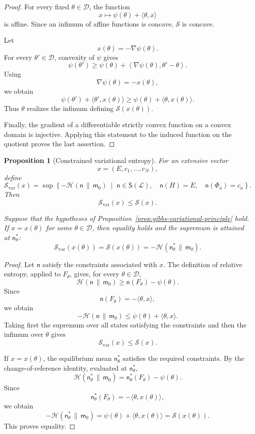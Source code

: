 \documentclass[10pt,a4paper]{amsart}
\newtheorem{Proposition}[Theorem]{Proposition}
\begin{document}
\begin{proof}
For every fixed $\theta\in\mathcal D$, the function
\[
x\longmapsto
\psi(\theta)+\langle\theta,x\rangle
\]
is affine. Since an infimum of affine functions is concave,
$\mathcal S$ is concave.

Let
\[
x(\theta)=-\nabla\psi(\theta).
\]
For every $\theta'\in\mathcal D$, convexity of $\psi$ gives
\[
\psi(\theta')
\geq
\psi(\theta)
+
\left\langle
\nabla\psi(\theta),\theta'-\theta
\right\rangle.
\]
Using
\[
\nabla\psi(\theta)=-x(\theta),
\]
we obtain
\[
\psi(\theta')
+
\langle\theta',x(\theta)\rangle
\geq
\psi(\theta)
+
\langle\theta,x(\theta)\rangle.
\]
Thus $\theta$ realizes the infimum defining
$\mathcal S(x(\theta))$.

Finally, the gradient of a differentiable strictly convex function on a
convex domain is injective. Applying this statement to the induced
function on the quotient proves the last assertion.
\end{proof}

\begin{Proposition}[Constrained variational entropy]
\label{prop:constrained-entropy}
For an extensive vector
\[
x=(E,c_1,\ldots,c_N),
\]
define
\[
\mathcal S_{\mathrm{var}}(x)
=
\sup
\left\{
-\mathcal H(\mathsf n\,\|\,\mathsf m_0)
\;\middle|\;
\mathsf n\in\mathsf S(\mathcal L),
\quad
\mathsf n(H)=E,
\quad
\mathsf n(\Phi_a)=c_a
\right\}.
\]
Then
\[
\mathcal S_{\mathrm{var}}(x)
\leq
\mathcal S(x).
\]

Suppose that the hypotheses of
Proposition~\ref{prop:gibbs-variational-principle} hold. If
$x=x(\theta)$ for some $\theta\in\mathcal D$, then equality holds and
the supremum is attained at $\mathsf n_\theta^*$:
\[
\mathcal S_{\mathrm{var}}(x(\theta))
=
\mathcal S(x(\theta))
=
-\mathcal H(\mathsf n_\theta^*\,\|\,\mathsf m_0).
\]
\end{Proposition}

\begin{proof}
Let $\mathsf n$ satisfy the constraints associated with $x$. The
definition of relative entropy, applied to $F_\theta$, gives, for every
$\theta\in\mathcal D$,
\[
\mathcal H(\mathsf n\,\|\,\mathsf m_0)
\geq
\mathsf n(F_\theta)-\psi(\theta).
\]
Since
\[
\mathsf n(F_\theta)
=
-\langle\theta,x\rangle,
\]
we obtain
\[
-\mathcal H(\mathsf n\,\|\,\mathsf m_0)
\leq
\psi(\theta)+\langle\theta,x\rangle.
\]
Taking first the supremum over all states satisfying the constraints
and then the infimum over $\theta$ gives
\[
\mathcal S_{\mathrm{var}}(x)
\leq
\mathcal S(x).
\]

If $x=x(\theta)$, the equilibrium mean $\mathsf n_\theta^*$ satisfies
the required constraints. By the change-of-reference identity,
evaluated at $\mathsf n_\theta^*$,
\[
\mathcal H(\mathsf n_\theta^*\,\|\,\mathsf m_0)
=
\mathsf n_\theta^*(F_\theta)-\psi(\theta).
\]
Since
\[
\mathsf n_\theta^*(F_\theta)
=
-\langle\theta,x(\theta)\rangle,
\]
we obtain
\[
-\mathcal H(\mathsf n_\theta^*\,\|\,\mathsf m_0)
=
\psi(\theta)+\langle\theta,x(\theta)\rangle
=
\mathcal S(x(\theta)).
\]
This proves equality.
\end{proof}
\end{document}
